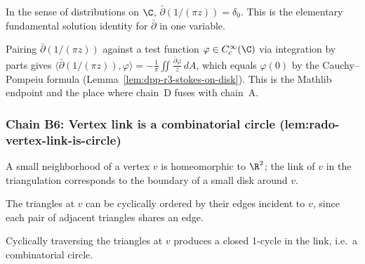 \begin{lemma}[Pass D.4: distributional $\bar\partial(1/z) = \pi \delta_{0}$]
\label{lem:srt-r4-dbar-delta}
In the sense of distributions on $\C$, $\bar\partial (1/(\pi z))
= \delta_{0}$.  This is the elementary fundamental solution
identity for $\bar\partial$ in one variable.
\leanok
\end{lemma}

\begin{lemma}
\label{lem:srt-r5-pompeiu-link}
Pairing $\bar\partial(1/(\pi z))$ against a test function
$\varphi \in C^{\infty}_{c}(\C)$ via integration by parts gives
$\langle \bar\partial(1/(\pi z)), \varphi\rangle =
-\frac{1}{\pi}\iint \frac{\bar\partial \varphi}{z}\,dA$,
which equals $\varphi(0)$ by the Cauchy--Pompeiu formula
(Lemma~\ref{lem:dpp-r3-stokes-on-disk}).  This is the
Mathlib endpoint and the place where chain~D fuses with
chain~A.
\leanok
\end{lemma}

\subsubsection*{Chain B6: Vertex link is a combinatorial circle (lem:rado-vertex-link-is-circle)}

\begin{lemma}
\label{lem:rvl-r1}
A small neighborhood of a vertex $v$ is homeomorphic to $\R^{2}$; the link of $v$ in the triangulation corresponds to the boundary of a small disk around $v$.
\leanok
\end{lemma}

\begin{lemma}
\label{lem:rvl-r2}
The triangles at $v$ can be cyclically ordered by their edges incident to $v$, since each pair of adjacent triangles shares an edge.
\leanok
\end{lemma}

\begin{lemma}
\label{lem:rvl-r3}
Cyclically traversing the triangles at $v$ produces a closed 1-cycle in the link, i.e.\ a combinatorial circle.
\leanok
\end{lemma}

